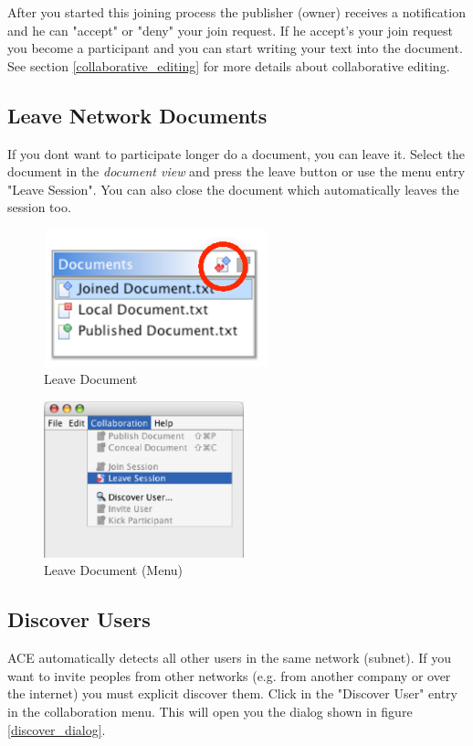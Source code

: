 \documentclass[11pt,a4paper]{article}
\begin{document}
After you started this joining process the publisher (owner) receives a notification and he can "accept" or "deny" your join request. If he accept's your join request you become a participant and you can start writing your text into the document. See section \ref{collaborative_editing} for more details about collaborative editing.

\subsection{Leave Network Documents}
If you dont want to participate longer do a document, you can leave it. Select the document in the \textit{document view} and press the leave button or use the menu entry "Leave Session". You can also close the document which automatically leaves the session too.
\begin{figure}[H]
\begin{center}
  \includegraphics[height=1.56in, width=2.56in]{../images/usermanual/g_dview_leave.eps}
\caption{Leave Document}
\label{default}
\end{center}
\end{figure}

\begin{figure}[H]
\begin{center}
  \includegraphics[height=1.78in, width=2.28in]{../images/usermanual/menu_collab_leave.eps}
\caption{Leave Document (Menu)}
\label{default}
\end{center}
\end{figure}


\subsection{Discover Users}
ACE automatically detects all other users in the same network (subnet). If you want to invite peoples from other networks (e.g. from another company or over the internet) you must explicit discover them. Click in the "Discover User" entry in the collaboration menu. This will open you the dialog shown in figure \ref{discover_dialog}.
\end{document}
